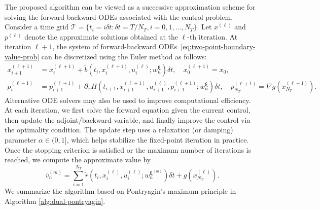 \documentclass[11pt]{article}
\numberwithin{equation}{section}
\theoremstyle{plain}
\theoremstyle{definition}
\theoremstyle{remark}
\begin{document}
The proposed algorithm can be viewed as a successive approximation scheme for solving the forward-backward ODEs associated with the control problem. Consider a time grid $\mathcal{T} = \{t_i = i\delta t: \delta t = T/N_T, i= 0,1,\dots, N_T\}$. Let $x^{(\ell)}$ and $p^{(\ell)} $ denote the approximate solutions obtained at the $\ell$-th iteration.
At iteration $\ell+1$, the system of forward-backward ODEs~\eqref{eq:two-point-boundary-value-prob} can be discretized using the Euler method as follows: 
\begin{align}
    x_{i+1}^{(\ell+1)} &= x_i^{(\ell+1)} + \tilde{b}(t_i, x_i^{(\ell+1)}, u_i^{(\ell)}; w_n^{\bm{\xi}}) \delta t, \quad x_{0}^{(\ell+1)} = x_0, \label{eq:forward-euler-ode} \\
    p_i^{(\ell + 1)} &= p_{i+1}^{(\ell+1)} + \partial_x H(t_{i+1}, x_{i+1}^{(\ell+1)}, u_{i+1}^{(\ell)}, p_{i+1}^{(\ell+1)}; w_n^{\bm{\xi}})\delta t, \quad p_{N_T}^{(\ell+1)} = \nabla g(x_{N_T}^{(\ell+1)}). \label{eq:backward-euler-ode}
\end{align}
Alternative ODE solvers may also be used to improve computational efficiency.
At each iteration, we first solve the forward equation given the current control, then update the adjoint/backward variable, and finally improve the control via the optimality condition. The update step uses a relaxation (or damping) parameter $\alpha \in (0,1]$, which helps stabilize the fixed-point iteration in practice. Once the stopping criterion is satisfied or the maximum number of iterations is reached, we compute the approximate value by 
\begin{equation} \label{eq:approx-pathwise-value}
    \overline{v}_n^{(m)} = \sum_{i=1}^{N_T} \tilde{r}(t_i, x_i^{(\ell)}, u_i^{(\ell)};w_n^{\bm{\xi}^{(m)}}) \delta t + g(x_{N_T}^{(\ell)}). 
\end{equation}
We summarize the algorithm based on Pontryagin's maximum principle in Algorithm \ref{alg:dual-pontryagin}. 
\end{document}
